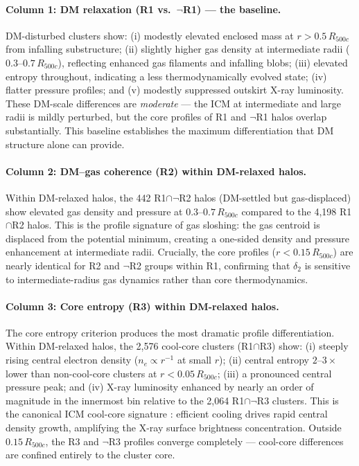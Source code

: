 \documentclass[12pt]{article}
\newcommand{\Rfive}{R_{500c}}
\newcommand{\deltaii}{\delta_2}
\begin{document}
\paragraph{Column 1: DM relaxation (R1 vs.\ $\lnot$R1) --- the baseline.}
DM-disturbed clusters show: (i) modestly elevated enclosed mass at $r > 0.5\,\Rfive$
from infalling substructure; (ii) slightly higher gas density at intermediate radii
($0.3$--$0.7\,\Rfive$), reflecting enhanced gas filaments and infalling blobs;
(iii) elevated entropy throughout, indicating a less thermodynamically evolved state;
(iv) flatter pressure profiles; and (v) modestly suppressed outskirt X-ray luminosity.
These DM-scale differences are \emph{moderate} --- the ICM at intermediate and large radii
is mildly perturbed, but the core profiles of R1 and $\lnot$R1 halos overlap substantially.
This baseline establishes the maximum differentiation that DM structure alone can provide.

\paragraph{Column 2: DM--gas coherence (R2) within DM-relaxed halos.}
Within DM-relaxed halos, the 442 R1$\cap\lnot$R2 halos (DM-settled but gas-displaced)
show elevated gas density and pressure at $0.3$--$0.7\,\Rfive$ compared to the 4{,}198
R1$\cap$R2 halos.  This is the profile signature of gas sloshing: the gas centroid is
displaced from the potential minimum, creating a one-sided density and pressure enhancement
at intermediate radii.  Crucially, the core profiles ($r < 0.15\,\Rfive$) are nearly
identical for R2 and $\lnot$R2 groups within R1, confirming that $\deltaii$ is sensitive
to intermediate-radius gas dynamics rather than core thermodynamics.

\paragraph{Column 3: Core entropy (R3) within DM-relaxed halos.}
The core entropy criterion produces the most dramatic profile differentiation.
Within DM-relaxed halos, the 2{,}576 cool-core clusters (R1$\cap$R3) show:
(i) steeply rising central electron density ($n_e \propto r^{-1}$ at small $r$);
(ii) central entropy $2$--$3\times$ lower than non-cool-core clusters at $r < 0.05\,\Rfive$;
(iii) a pronounced central pressure peak; and
(iv) X-ray luminosity enhanced by nearly an order of magnitude in the innermost bin
  relative to the 2{,}064 R1$\cap\lnot$R3 clusters.
This is the canonical ICM cool-core signature \citep{vikhlinin2006}: efficient cooling
drives rapid central density growth, amplifying the X-ray surface brightness concentration.
Outside $0.15\,\Rfive$, the R3 and $\lnot$R3 profiles converge completely --- cool-core
differences are confined entirely to the cluster core.
\end{document}
